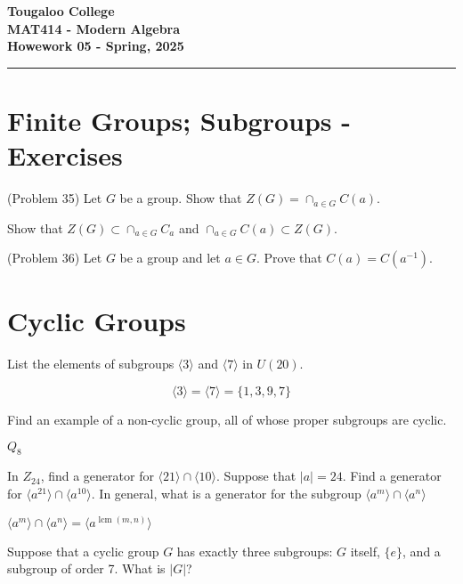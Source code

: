 \documentclass[12pt]{exam}
\newcommand{\paper}[5]{
    \setcounter{page}{1}
    
    \begin{minipage}{\textwidth}
    \Large{\textbf{Tougaloo College}}\\
    \textbf{#2}\\
    \textbf{#5 - #3}\\
    \end{minipage}
    \hfill
    
    \vspace{0.1in}
    \rule[1ex]{\textwidth}{2pt}
    }
\begin{document}
\paper{03//2025}{MAT414 - Modern Algebra}{Spring, 2025}{}{Howework 05}

\section*{Finite Groups; Subgroups - Exercises}
\begin{questions}



\question[20] (Problem 35) Let \(G\) be a group. Show that \(Z(G)=\cap_{a \in G} C(a)\).

\begin{solution}
    Show that \(Z(G) \subset \cap_{a\in G}C_a\) and \(\cap_{a\in G} C(a) \subset Z(G)\).
\end{solution}
\droptotalpoints

\question[20] (Problem 36) Let \(G\) be a group and let \(a \in G\). Prove that \(C(a) = C(a^{-1}).\)

\section*{Cyclic Groups}

\question[] List the elements of subgroups \(\langle 3 \rangle\) and \(\langle  7 \rangle\) in \(U(20)\).

\begin{solution}
    \[ \langle 3 \rangle = \langle 7 \rangle= \{1,3,9,7\}\]
\end{solution}

\question[] Find an example of a non-cyclic group, all of  whose proper subgroups are cyclic. 

\begin{solution}
    \(Q_8\)
\end{solution}

\question[] In \(Z_{24}\), find a generator for \(\langle 21 \rangle \cap \langle 10 \rangle\). Suppose that \(|a|=24\). Find a generator for \(\langle a^{21} \rangle \cap \langle a^{10} \rangle\). In general, what is a generator for the subgroup \(\langle a^{m}\rangle \cap \langle a^n \rangle\)

\begin{solution}
    \(\langle a^m\rangle \cap \langle a^n \rangle = \langle a^{\operatorname{lcm}(m,n)} \rangle\)
\end{solution}


\question[] Suppose that a cyclic group \(G\) has exactly three subgroups: \(G\) itself, \(\{e\}\), and a subgroup of order 7. What is \(|G|\)? 


\end{questions}
\end{document}
